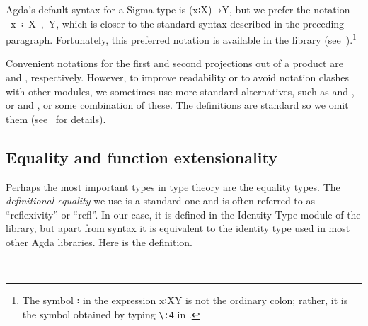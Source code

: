 \documentclass[a4paper,UKenglish,cleveref,autoref,thm-restate,11pt]{lipics-v2021}
\begin{document}
Agda's default syntax for a Sigma type is (\ab x꞉\ab X)\as →\ab Y, but we prefer the notation ~\ab x~꞉~\ab X~,~\ab Y, which is closer to the standard syntax described in the preceding paragraph. Fortunately, this preferred notation is available in the \typetopology library (see~\cite[Σ types]{MHE}).\footnote{The symbol \as ꞉ in the expression \ab x\as ꞉\ab X\AgdaComma{}\ab Y is not the ordinary colon; rather, it is the symbol obtained by typing \texttt{\textbackslash{}:4} in \agdatwomode.} 

\newcommand\FstUnder{\AgdaOperator{\AgdaFunction{∣\AgdaUnderscore{}∣}}\xspace}
\newcommand\SndUnder{\AgdaOperator{\AgdaFunction{∥\AgdaUnderscore{}∥}}\xspace}
Convenient notations for the first and second projections out of a product are \FstUnder and \SndUnder, respectively. However, to improve readability or to avoid notation clashes with other modules, we sometimes use more standard alternatives, such as  and , or  and , or some combination of these. The definitions are standard so we omit them (see~\cite{DeMeo:2021} for details).







\subsection{Equality and function extensionality}\label{sec:equal-funct-extens}
Perhaps the most important types in type theory are the equality types. The \emph{definitional equality} we use is a standard one and is often referred to as ``reflexivity'' or ``refl''.  In our case, it is defined in the Identity-Type module of the \TypeTopology library, but apart from syntax it is equivalent to the identity type used in most other Agda libraries. Here is the definition.
\ccpad
\begin{code}%
\>[0]\AgdaSpace{}%
\AgdaSpace{}%
\AgdaSymbol{\{}\AgdaSpace{}%
\AgdaSymbol{:}\AgdaSpace{}%
\AgdaSymbol{\}}\AgdaSpace{}%
\AgdaSymbol{\{}\AgdaSpace{}%
\AgdaSymbol{:}\AgdaSpace{}%
\AgdaSpace{}%
\AgdaSpace{}%
\AgdaSymbol{\}}\AgdaSpace{}%
\AgdaSymbol{:}\AgdaSpace{}%
\AgdaSpace{}%
\AgdaSpace{}%
\AgdaSpace{}%
\AgdaSpace{}%
\AgdaSpace{}%
\AgdaSpace{}%
\<%
\\
\>[0][@{}l@{\AgdaIndent{0}}]%
\>[2]\AgdaSpace{}%
\AgdaSymbol{:}\AgdaSpace{}%
\AgdaSymbol{\{}\AgdaSpace{}%
\AgdaSymbol{:}\AgdaSpace{}%
\AgdaSymbol{\}}\AgdaSpace{}%
\AgdaSpace{}%
\AgdaSpace{}%
\AgdaSpace{}%
\<%
\end{code}
\scpad
\end{document}
